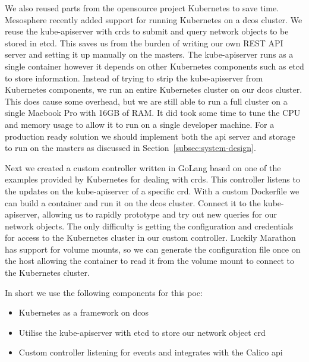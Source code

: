 We also reused parts from the opensource project Kubernetes to save time. Mesosphere recently added support for running Kubernetes on a \gls{dcos} cluster. We reuse the kube-apiserver with \glspl{crd} to submit and query network objects to be stored in etcd. This saves us from the burden of writing our own REST API server and setting it up manually on the masters. The kube-apiserver runs as a single container however it depends on other Kubernetes components such as etcd to store information. Instead of trying to strip the kube-apiserver from Kubernetes components, we run an entire Kubernetes cluster on our \gls{dcos} cluster. This does cause some overhead, but we are still able to run a full cluster on a single Macbook Pro with 16GB of RAM. It did took some time to tune the CPU and memory usage to allow it to run on a single developer machine. For a production ready solution we should implement both the \gls{api} server and storage to run on the masters as discussed in Section~\ref{subsec:system-design}.

Next we created a custom controller written in GoLang\cite{golang} based on one of the examples provided by Kubernetes for dealing with \glspl{crd}. This controller listens to the updates on the kube-apiserver of a specific \gls{crd}. With a custom Dockerfile we can build a container and run it on the \gls{dcos} cluster. Connect it to the kube-apiserver, allowing us to rapidly prototype and try out new queries for our network objects. The only difficulty is getting the configuration and credentials for access to the Kubernetes cluster in our custom controller. Luckily Marathon has support for volume mounts, so we can generate the configuration file once on the host allowing the container to read it from the volume mount to connect to the Kubernetes cluster.

In short we use the following components for this \gls{poc}:
\begin{itemize}
    \item Kubernetes as a framework on \gls{dcos}
    \item Utilise the kube-apiserver with etcd to store our network object \gls{crd}
    \item Custom controller listening for events and integrates with the Calico \gls{api}
\end{itemize}
